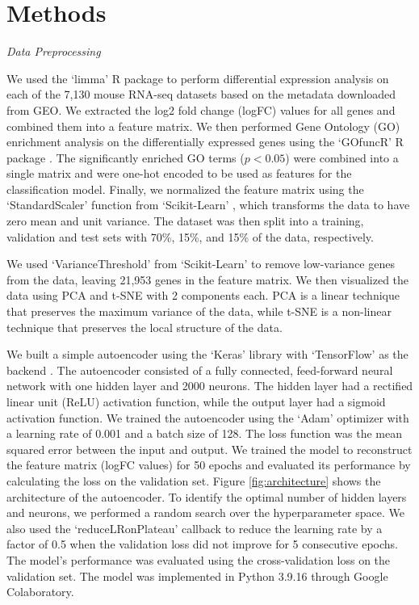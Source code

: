 
\section{Methods}


\vspace{0.2cm}
\emph{Data Preprocessing}
\vspace{0.0cm}

We used the `limma' R package \cite{limma} to perform differential expression analysis
on each of the 7,130 mouse RNA-seq datasets based on the metadata downloaded from GEO.
We extracted the log2 fold change (logFC) values for all genes and combined them into a
feature matrix. We then performed Gene Ontology (GO) enrichment analysis on the
differentially expressed genes using the `GOfuncR' R package \cite{GOfuncR}. The
significantly enriched GO terms ($p < 0.05$) were combined into a single matrix and were
one-hot encoded to be used as features for the classification model. Finally, we
normalized the feature matrix using the `StandardScaler' function from `Scikit-Learn'
\cite{sklearn}, which transforms the data to have zero mean and unit variance. The
dataset was then split into a training, validation and test sets with 70\%, 15\%, and
15\% of the data, respectively.

\vspace{0.2cm}

We used `VarianceThreshold' from `Scikit-Learn' \cite{sklearn} to remove low-variance
genes from the data, leaving 21,953 genes in the feature matrix. We then visualized the
data using PCA and t-SNE with 2 components each. PCA is a linear technique that preserves
the maximum variance of the data, while t-SNE is a non-linear technique that preserves
the local structure of the data.

\vspace{0.2cm}

We built a simple autoencoder using the `Keras' library with `TensorFlow' as the backend
\cite{tensorflow}. The autoencoder consisted of a fully connected, feed-forward neural
network with one hidden layer and 2000 neurons. The hidden layer had a rectified linear
unit (ReLU) activation function, while the output layer had a sigmoid activation function.
We trained the autoencoder using the `Adam' optimizer with a learning rate of 0.001 and a
batch size of 128. The loss function was the mean squared error between the input and
output. We trained the model to reconstruct the feature matrix (logFC values) for 50
epochs and evaluated its performance by calculating the loss on the validation set.
Figure \ref{fig:architecture} shows the architecture of the autoencoder. To identify the
optimal number of hidden layers and neurons, we performed a random search over the
hyperparameter space. We also used the `reduceLRonPlateau' callback to reduce the
learning rate by a factor of 0.5 when the validation loss did not improve for 5
consecutive epochs. The model's performance was evaluated using the cross-validation
loss on the validation set. The model was implemented in Python 3.9.16 through Google
Colaboratory.


